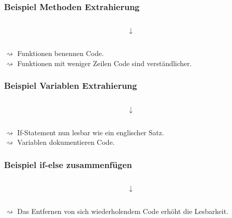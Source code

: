 \documentclass[10pt]{beamer}
\begin{document}
\begin{frame}[fragile]
  \frametitle{Beispiel Methoden Extrahierung}
  \begin{figure}[thp]
  \centering 
  \begin{minipage}{0.4\textwidth}
  \inputminted{python}{extract_method_bad.py}
  \end{minipage}
  \end{figure}
  \[\downarrow\]
  \begin{figure}[thp]
  \centering 
  \begin{minipage}{0.4\textwidth}
  \inputminted{python}{extract_method_good.py}
  \end{minipage}
  \end{figure}
  \vspace*{0.5cm}
  $\rightsquigarrow$ Funktionen benennen Code. \\
  $\rightsquigarrow$ Funktionen mit weniger Zeilen Code sind 
  verständlicher.
\end{frame}

\begin{frame}
  \frametitle{Beispiel Variablen Extrahierung}
  \begin{figure}[thp]
  \centering 
  \begin{minipage}{0.4\textwidth}
  \inputminted{python}{extract_variable_bad.py}
  \end{minipage}
  \end{figure}
  \[\downarrow\]
  \begin{figure}[thp]
  \centering 
  \begin{minipage}{0.4\textwidth}
  \inputminted{python}{extract_variable_good.py}
  \end{minipage}
  \end{figure}
  \vspace*{0.5cm}
  $\rightsquigarrow$ If-Statement nun lesbar wie ein englischer Satz.\\
  $\rightsquigarrow$ Variablen dokumentieren Code. 
\end{frame}

\begin{frame}
  \frametitle{Beispiel if-else zusammenfügen}
  \begin{figure}[thp]
  \centering 
  \begin{minipage}{0.4\textwidth}
  \inputminted{python}{consolidate_if_bad.py}
  \end{minipage}
  \end{figure}
  \[\downarrow\]
  \begin{figure}[thp]
  \centering 
  \begin{minipage}{0.4\textwidth}
  \inputminted{python}{consolidate_if_good.py}
  \end{minipage}
  \end{figure}
  \vspace*{0.5cm}
  $\rightsquigarrow$ Das Entfernen von sich wiederholendem Code erhöht die Lesbarkeit.\\
\end{frame}
\end{document}
